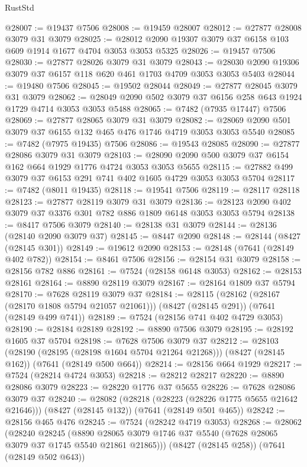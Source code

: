 \begin{lexlean}{RustStd}
\begin{coremodule}
@28007 := @19437 @7506
@28008 := @19459 @28007
@28012 := @27877 @28008 @3079 @31 @3079
@28025 := @28012 @2090 @19307 @3079 @37 @6158 @103 @609 @1914 @1677 @4704 @3053 @3053 @5325
@28026 := @19457 @7506
@28030 := @27877 @28026 @3079 @31 @3079
@28043 := @28030 @2090 @19306 @3079 @37 @6157 @118 @620 @461 @1703 @4709 @3053 @3053 @5403
@28044 := @19480 @7506
@28045 := @19502 @28044
@28049 := @27877 @28045 @3079 @31 @3079
@28062 := @28049 @2090 @502 @3079 @37 @6156 @258 @643 @1924 @1729 @4714 @3053 @3053 @5488
@28065 := @7482 (@7935 @17447) @7506
@28069 := @27877 @28065 @3079 @31 @3079
@28082 := @28069 @2090 @501 @3079 @37 @6155 @132 @465 @476 @1746 @4719 @3053 @3053 @5540
@28085 := @7482 (@7975 @19435) @7506
@28086 := @19543 @28085
@28090 := @27877 @28086 @3079 @31 @3079
@28103 := @28090 @2090 @500 @3079 @37 @6154 @162 @664 @1929 @1776 @4724 @3053 @3053 @5655
@28115 := @27882 @499 @3079 @37 @6153 @291 @741 @402 @1605 @4729 @3053 @3053 @5704
@28117 := @7482 (@8011 @19435)
@28118 := @19541 @7506
@28119 := @28117 @28118
@28123 := @27877 @28119 @3079 @31 @3079
@28136 := @28123 @2090 @402 @3079 @37 @3376 @301 @782 @886 @1809 @6148 @3053 @3053 @5794
@28138 := @8417 @7506 @3079
@28140 := @28138 @31 @3079
@28144 := @28136 (@28140 @2090 @3079 @37)
@28145 := @8447 @2090
@28148 := @28144 (@8427 (@28145 @301))
@28149 := @19612 @2090
@28153 := @28148 (@7641 (@28149 @402 @782))
@28154 := @8461 @7506
@28156 := @28154 @31 @3079
@28158 := @28156 @782 @886
@28161 := @7524 (@28158 @6148 @3053)
@28162 := @28153 @28161
@28164 := @8890 @28119 @3079
@28167 := @28164 @1809 @37 @5794
@28170 := @7628 @28119 @3079 @37
@28184 := @28115
    (@28162 (@28167 (@28170 @1808 @5794 @21057 @21061)))
    (@8427 (@28145 @291))
    (@7641 (@28149 @499 @741))
@28189 := @7524 (@28156 @741 @402 @4729 @3053)
@28190 := @28184 @28189
@28192 := @8890 @7506 @3079
@28195 := @28192 @1605 @37 @5704
@28198 := @7628 @7506 @3079 @37
@28212 := @28103
    (@28190 (@28195 (@28198 @1604 @5704 @21264 @21268)))
    (@8427 (@28145 @162))
    (@7641 (@28149 @500 @664))
@28214 := @28156 @664 @1929
@28217 := @7524 (@28214 @4724 @3053)
@28218 := @28212 @28217
@28220 := @8890 @28086 @3079
@28223 := @28220 @1776 @37 @5655
@28226 := @7628 @28086 @3079 @37
@28240 := @28082
    (@28218 (@28223 (@28226 @1775 @5655 @21642 @21646)))
    (@8427 (@28145 @132))
    (@7641 (@28149 @501 @465))
@28242 := @28156 @465 @476
@28245 := @7524 (@28242 @4719 @3053)
@28268 := @28062
    (@28240
      @28245
      (@8890 @28065 @3079 @1746 @37 @5540 (@7628 @28065 @3079 @37 @1745 @5540 @21861 @21865)))
    (@8427 (@28145 @258))
    (@7641 (@28149 @502 @643))

\end{coremodule}
\end{lexlean}
